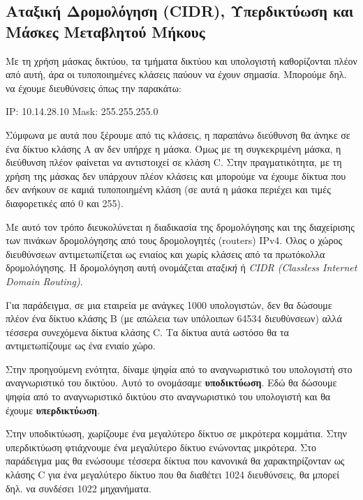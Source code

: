 %
%
\subsection{Αταξική Δρομολόγηση (CIDR), Υπερδικτύωση και Μάσκες Μεταβλητού Μήκους}

Με τη χρήση μάσκας δικτύου, τα τμήματα δικτύου και υπολογιστή καθορίζονται πλέον από αυτή, άρα οι τυποποιημένες κλάσεις παύουν να έχουν σημασία. Μπορούμε δηλ. να έχουμε διευθύνσεις όπως την παρακάτω:

IP: 10.14.28.10
Mask: 255.255.255.0

Σύμφωνα με αυτά που ξέρουμε από τις κλάσεις, η παραπάνω διεύθυνση θα άνηκε σε ένα δίκτυο κλάσης Α αν δεν υπήρχε η μάσκα. Όμως με τη συγκεκριμένη μάσκα, η διεύθυνση πλέον φαίνεται να αντιστοιχεί σε κλάση C. Στην πραγματικότητα, με τη χρήση της μάσκας δεν υπάρχουν πλέον κλάσεις και μπορούμε να έχουμε δίκτυα που δεν ανήκουν σε καμιά τυποποιημένη κλάση (σε αυτά η μάσκα περιέχει και τιμές διαφορετικές από 0 και 255).

Με αυτό τον τρόπο διευκολύνεται η διαδικασία της δρομολόγησης και της διαχείρισης των πινάκων δρομολόγησης από τους δρομολογητές (routers) IPv4.  Όλος ο χώρος διευθύνσεων αντιμετωπίζεται ως ενιαίος και χωρίς κλάσεις από τα πρωτόκολλα δρομολόγησης.  Η δρομολόγηση αυτή ονομάζεται \emph{αταξική} ή \emph{CIDR (Classless Internet Domain Routing)}.

Για παράδειγμα, σε μια εταιρεία με ανάγκες 1000 υπολογιστών, δεν θα δώσουμε πλέον ένα δίκτυο κλάσης B (με απώλεια των υπόλοιπων 64534 διευθύνσεων) αλλά τέσσερα συνεχόμενα δίκτυα κλάσης C. Τα δίκτυα αυτά ωστόσο θα τα αντιμετωπίζουμε ως ένα ενιαίο χώρο.

\begin{inthebox}
Στην προηγούμενη ενότητα, δίναμε ψηφία από το αναγνωριστικό του υπολογιστή στο αναγνωριστικό του δικτύου. Αυτό το ονομάσαμε \textbf{υποδικτύωση}. Εδώ θα δώσουμε ψηφία από το αναγνωριστικό δικτύου στο αναγνωριστικό του υπολογιστή και θα έχουμε \textbf{υπερδικτύωση}.

Στην υποδικτύωση,  χωρίζουμε ένα μεγαλύτερο δίκτυο σε μικρότερα κομμάτια. Στην υπερδικτύωση φτιάχνουμε ένα μεγαλύτερο δίκτυο ενώνοντας μικρότερα. Στο παράδειγμα μας θα ενώσουμε τέσσερα δίκτυα που κανονικά θα χαρακτηρίζονταν ως κλάσης C για ένα μεγαλύτερο δίκτυο που θα διαθέτει 1024 διευθύνσεις, θα μπορεί δηλ. να συνδέσει 1022 μηχανήματα.\\
\end{inthebox}

